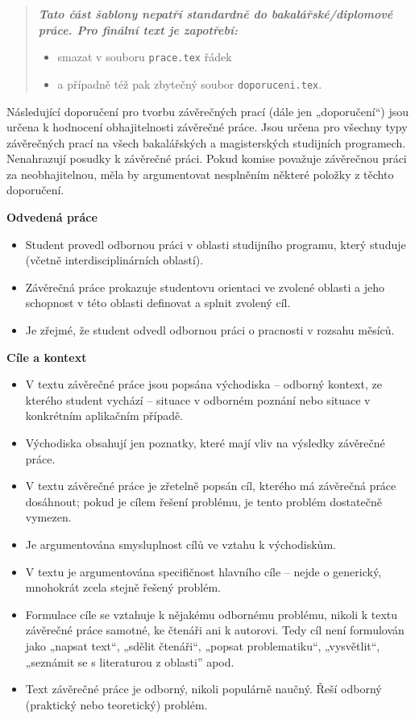 \begin{quote}
\bfseries\itshape
Tato část šablony nepatří standardně do bakalářské/diplomové práce. Pro finální 
text je zapotřebí:
\begin{itemize}
\item smazat v souboru \verb|prace.tex| řádek \verb||
\item  a případně též pak zbytečný soubor \verb|doporuceni.tex|.
\end{itemize}
\end{quote}

Následující doporučení pro tvorbu závěrečných prací (dále jen „doporučení“) jsou 
určena k hodnocení obhajitelnosti závěrečné práce. Jsou určena pro všechny typy 
závěrečných prací na všech bakalářských a magisterských studijních programech. 
Nenahrazují posudky k závěrečné práci. Pokud komise považuje závěrečnou práci za 
neobhajitelnou, měla by argumentovat nesplněním některé položky z těchto 
doporučení.

{\bfseries\sffamily\Large Odvedená práce}
\begin{itemize}
\item \vspace*{-2ex}Student provedl odbornou práci v oblasti studijního programu, který studuje (včetně interdisciplinárních oblastí).
\item Závěrečná práce prokazuje studentovu orientaci ve zvolené oblasti a jeho schopnost v této oblasti definovat a splnit zvolený cíl. 
\item Je zřejmé, že student odvedl odbornou práci o pracnosti v rozsahu měsíců.
\end{itemize}

{\bfseries\sffamily\Large Cíle a kontext}
\begin{itemize}
\item \vspace*{-2ex}V textu závěrečné práce jsou popsána východiska – odborný kontext, ze kterého student vychází – situace v odborném poznání nebo situace v konkrétním aplikačním případě.
\item Východiska obsahují jen poznatky, které mají vliv na výsledky závěrečné práce.
\item V textu závěrečné práce je zřetelně popsán cíl, kterého má závěrečná práce dosáhnout; pokud je cílem řešení problému, je tento problém dostatečně vymezen.
\item Je argumentována smysluplnost cílů ve vztahu k východiskům.
\item V textu je argumentována specifičnost hlavního cíle – nejde o generický, mnohokrát zcela stejně řešený problém.
\item Formulace cíle se vztahuje k nějakému odbornému problému, nikoli k textu závěrečné práce samotné, ke čtenáři ani k autorovi. Tedy cíl není formulován jako „napsat text“, „sdělit čtenáři“, „popsat problematiku“, „vysvětlit“, „seznámit se s literaturou z oblasti” apod.
\item Text závěrečné práce je odborný, nikoli populárně naučný. Řeší odborný (praktický nebo teoretický) problém.
\end{itemize}


